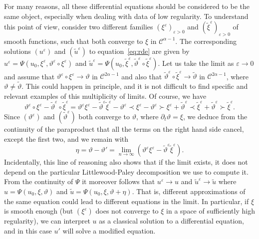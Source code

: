 \documentclass[11pt,a4paper]{article}
\theoremstyle{remark}
\newcommand{\CC}{\ensuremath{\mathscr{C}}}
\begin{document}
For many reasons, all these differential equations should be considered to be
the same object, especially when dealing with data of low regularity. To
understand this point of view, consider two different families $( \xi^{\varepsilon})_{\varepsilon >0}$ and $( \tilde{\xi}^\varepsilon )_{\varepsilon > 0}$ of smooth
functions, such that both converge to $\xi$ in $\CC^{\alpha -1}$. The
corresponding solutions $( u^\varepsilon )$ and $( \tilde{u}^\varepsilon)$ to
equation~{\eqref{eq:rde}} are given by $u^\varepsilon = \Psi ( u_{0} , \xi^\varepsilon ,\vartheta^\varepsilon \circ   \xi^\varepsilon )$ and $\tilde{u}^\varepsilon = \Psi ( u_{0} , \tilde{\xi}^\varepsilon,
\tilde{\vartheta}^\varepsilon \circ \tilde{\xi}^\varepsilon)$. Let us take the limit as $\varepsilon \rightarrow 0$ and assume that $\vartheta^\varepsilon \circ   \xi^\varepsilon \rightarrow \vartheta$
in $\CC^{2 \alpha -1}$ and also that $\tilde{\vartheta}^\varepsilon \circ   \tilde{\xi}^\varepsilon \rightarrow \tilde\vartheta$ in $\CC^{2 \alpha -1}$, where $\vartheta \neq \tilde\vartheta$. This could happen in principle, and it is not difficult to find specific and relevant examples of this multiplicity of limits. Of course, we have
\[
   \vartheta^\varepsilon \circ \xi^\varepsilon - \tilde{\vartheta}^\varepsilon \circ \tilde{\xi}^\varepsilon = \vartheta^\varepsilon \xi^\varepsilon - \tilde{\vartheta}^\varepsilon \tilde{\xi}^\varepsilon - \vartheta^\varepsilon \prec \xi^\varepsilon -  \vartheta^\varepsilon \succ \xi^\varepsilon + \tilde{\vartheta}^\varepsilon \prec \tilde{\xi}^\varepsilon +  \tilde{\vartheta}^\varepsilon \succ \tilde{\xi}^\varepsilon.
\]
Since $( \vartheta^\varepsilon )$ and $( \tilde{\vartheta}^\varepsilon )$ both converge to
$\vartheta$, where $\partial_{t} \vartheta = \xi$, we deduce from the
continuity of the paraproduct that all the terms on the right hand side cancel, except the first two, and we remain with
\[
   \eta = \vartheta - \vartheta' = \lim_{n \rightarrow \infty} ( \vartheta^\varepsilon \xi^\varepsilon - \tilde{\vartheta}^\varepsilon \tilde{\xi}^\varepsilon ).
\]
Incidentally, this line of reasoning also shows that if the limit exists, it
does not depend on the particular Littlewood-Paley decomposition we use to
compute it. From the continuity of $\Psi$ it moreover follows that $u^\varepsilon \rightarrow u$ and $\tilde{u}^\varepsilon \rightarrow \tilde{u}$ where $u= \Psi ( u_{0} , \xi , \vartheta )$ and $\tilde{u} = \Psi ( u_{0} , \xi , \vartheta + \eta )$. That is,
different approximations of the same equation could lead to different
equations in the limit. In particular, if $\xi$ is smooth enough (but
$(\xi^\varepsilon)$ does not converge to $\xi$ in a space of sufficiently high
regularity), we can interpret $u$ as a classical solution to a differential
equation, and in this case $u'$ will solve a modified equation.
\end{document}
